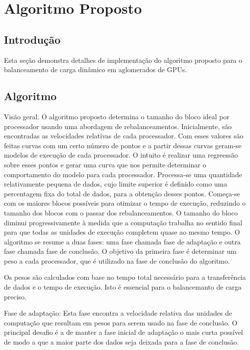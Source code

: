 \pagestyle{empty}
\cleardoublepage
\pagestyle{fancy}

\chapter{Algoritmo Proposto}\label{cap3}

\section{Introdução}\label{cap3:intro}

Esta seção demonstra detalhes de implementação do algoritmo proposto para o balanceamento de carga dinâmico em aglomerados de GPUs.


\section{Algoritmo}
Visão geral. O algoritmo proposto determina o tamanho do bloco ideal por processador usando uma abordagem de rebalanceamentos. Inicialmente, são encontradas as velocidades relativas de cada processador. Com esses valores são feitas curvas com um certo número de pontos e a partir dessas curvas geram-se modelos de execução de cada processador. O intuito é realizar uma regreessão sobre esses pontos e gerar uma curva que nos permite determinar o comportamento do modelo para cada processador. Processa-se uma quantidade relativamente pequena de dados, cujo limite superior é definido como uma percentagem fixa do total de dados, para a obtenção desses pontos. Começa-se com os maiores blocos possíveis para otimizar o tempo de execução, reduzindo o tamanho dos blocos com o passar dos rebalanceamentos. O tamanho do bloco diminui progressivamente à medida que a computação trabalha no sentido final para que todas as unidades de execução completem quase ao mesmo tempo. O algoritmo se resume a duas fases: uma fase chamada fase de adaptação e outra fase chamada fase de conclusão. O objetivo da primeira fase é determinar um peso a cada processador, que é utilizado na fase de conclusão do algoritmo.

Os pesos são calculados com base no tempo total necessário para a transferência de dados e o tempo de execução. Isto é essencial para o balancemanto de carga preciso.

Fase de adaptação: Esta fase encontra a velocidade relativa das unidades de computação que resultam em pesos para serem usado na fase de conclusão. O principal desafio é a de manter a fase inicial de adaptação o mais curta possível de modo a que a maior parte dos dados seja deixada para a fase de conclusão. 

